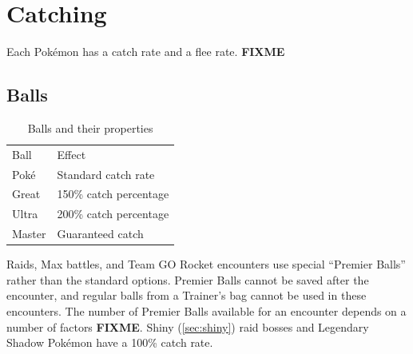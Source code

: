 \section{Catching}
\label{sec:catch}
Each Pokémon has a catch rate and a flee rate.
\textbf{FIXME}
\subsection{Balls}
\begin{table}[ht]
  \begin{center}
    \begin{tabular}{ll}
      Ball & Effect\\
      \Midrule
      Poké & Standard catch rate\\
      Great & 150\% catch percentage\\
      Ultra & 200\% catch percentage\\
      Master & Guaranteed catch\\
    \end{tabular}
  \end{center}
  \caption{Balls and their properties}
  \label{table:balls}
\end{table}
Raids, Max battles, and Team GO Rocket encounters use special ``Premier Balls''
  rather than the standard options.
Premier Balls cannot be saved after the encounter, and regular balls from
  a Trainer's bag cannot be used in these encounters.
The number of Premier Balls available for an encounter depends on a number of factors \textbf{FIXME}.
Shiny (\autoref{sec:shiny}) raid bosses and Legendary Shadow Pokémon have a 100\% catch rate.

